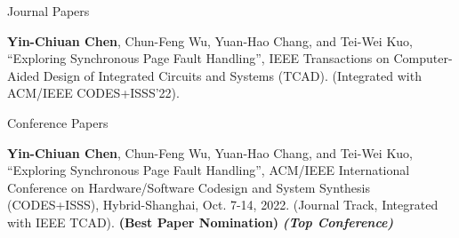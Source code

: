 

\begin{cventries}

  \cvpub
    {Journal Papers}
    {
      \begin{cvitems}
        \item {\textbf{Yin-Chiuan Chen}, Chun-Feng Wu, Yuan-Hao Chang, and Tei-Wei Kuo, “Exploring Synchronous Page Fault Handling”, IEEE Transactions on Computer-Aided Design of Integrated Circuits and Systems (TCAD). (Integrated with ACM/IEEE CODES+ISSS’22).}
      \end{cvitems}
    }

  \cvpub
    {Conference Papers}
    {
      \begin{cvitems}
        \item {\textbf{Yin-Chiuan Chen}, Chun-Feng Wu, Yuan-Hao Chang, and Tei-Wei Kuo, “Exploring Synchronous Page Fault Handling”, ACM/IEEE International Conference on Hardware/Software Codesign and System Synthesis (CODES+ISSS), Hybrid-Shanghai, Oct. 7-14, 2022. (Journal Track, Integrated with IEEE TCAD). \textbf{(Best Paper Nomination)} \textit{\textbf{(Top Conference)}} }
      \end{cvitems}
    }

\end{cventries}